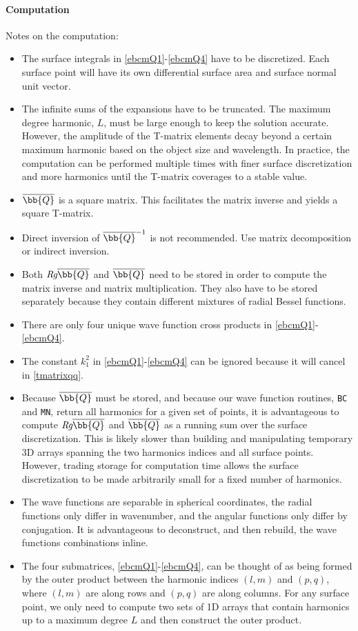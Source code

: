 \paragraph{Computation}
Notes on the computation:
\begin{itemize}
  \setlength{\itemsep}{1pt}
  \setlength{\parskip}{0pt}
  \setlength{\parsep}{0pt}
\item The surface integrals in \eqref{ebcmQ1}-\eqref{ebcmQ4} have to be discretized. Each surface point will have its own differential surface area and surface normal unit vector. 
\item The infinite sums of the expansions have to be truncated. The maximum degree harmonic, $L$, must be large enough to keep the solution accurate. However, the amplitude of the T-matrix elements decay beyond a certain maximum harmonic based on the object size and wavelength. In practice, the computation can be performed multiple times with finer surface discretization and more harmonics until the T-matrix coverages to a stable value.  
\item $\overline{\bb{Q}}$ is a square matrix. This facilitates the matrix inverse and yields a square T-matrix. 
\item Direct inversion of $\overline{\bb{Q}}^{-1}$ is not recommended. Use matrix decomposition or indirect inversion.
\item Both $\textit{Rg}\overline{\bb{Q}}$ and $ \overline{\bb{Q}}$ need to be stored in order to compute the matrix inverse and matrix multiplication. They also have to be stored separately because they contain different mixtures of radial Bessel functions. 
\item There are only four unique wave function cross products in \eqref{ebcmQ1}-\eqref{ebcmQ4}.
\item The constant $k_1^2$ in \eqref{ebcmQ1}-\eqref{ebcmQ4} can be ignored because it will cancel in \eqref{tmatrixqq}.
\item Because $ \overline{\bb{Q}}$ must be stored, and because our wave function routines, \texttt{BC} and \texttt{MN}, return all harmonics for a given set of points, it is advantageous to compute $\textit{Rg}\overline{\bb{Q}}$ and $\overline{\bb{Q}}$ as a running sum over the surface discretization. This is likely slower than building and manipulating temporary 3D arrays spanning the two harmonics indices and all surface points. However, trading storage for computation time allows the surface discretization to be made arbitrarily small for a fixed number of harmonics.
\item The wave functions are separable in spherical coordinates, the radial functions only differ in wavenumber, and the angular functions only differ by conjugation. It is advantageous to deconstruct, and then rebuild, the wave functions combinations inline.
\item The four submatrices, \eqref{ebcmQ1}-\eqref{ebcmQ4}, can be thought of as being formed by the outer product between the harmonic indices $(l,m)$ and $(p,q)$, where $(l,m)$ are along rows and $(p,q)$ are along columns. For any surface point, we only need to compute two sets of 1D arrays that contain harmonics up to a maximum degree $L$ and then construct the outer product.


\end{itemize}
